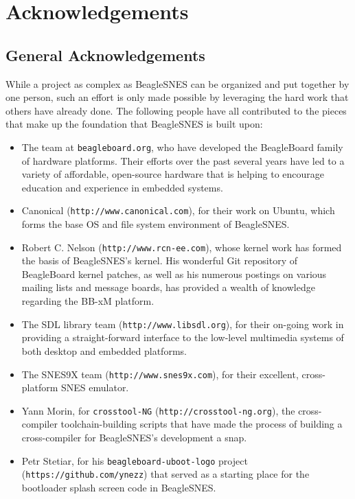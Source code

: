 \chapter{Acknowledgements}

\section{General Acknowledgements}

While a project as complex as BeagleSNES can be organized and put together by one person, such an effort is only made possible by leveraging the hard work that others have already done.  The following people have all contributed to the pieces that make up the foundation that BeagleSNES is built upon:

\begin{itemize}
\item The team at \texttt{beagleboard.org}, who have developed the BeagleBoard family of hardware platforms.  Their efforts over the past several years have led to a variety of affordable, open-source hardware that is helping to encourage education and experience in embedded systems. 
\item Canonical (\texttt{http://www.canonical.com}), for their work on Ubuntu, which forms the base OS and file system environment of BeagleSNES.
\item Robert C. Nelson (\texttt{http://www.rcn-ee.com}), whose kernel work has formed the basis of BeagleSNES's kernel.  His wonderful Git repository of BeagleBoard kernel patches, as well as his numerous postings on various mailing lists and message boards, has provided a wealth of knowledge regarding the BB-xM platform.
\item The SDL library team (\texttt{http://www.libsdl.org}), for their on-going work in providing a straight-forward interface to the low-level multimedia systems of both desktop and embedded platforms.
\item The SNES9X team (\texttt{http://www.snes9x.com}), for their excellent, cross-platform SNES emulator. 
\item Yann Morin, for \texttt{crosstool-NG} (\texttt{http://crosstool-ng.org}), the cross-compiler toolchain-building scripts that have made the process of building a cross-compiler for BeagleSNES's development a snap. 
\item Petr Stetiar, for his \texttt{beagleboard-uboot-logo} project (\texttt{https://github.com/ynezz}) that served as a starting place for the bootloader splash screen code in BeagleSNES.
\end{itemize}

